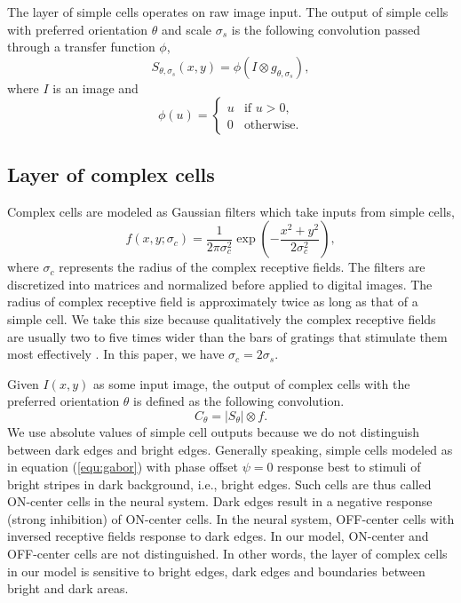 \documentclass[5p]{elsarticle}
\begin{document}
The layer of simple cells operates on raw image input. 
The output of simple cells with preferred orientation $\theta$
and scale $\sigma_s$ is the following convolution passed through a transfer function $\phi$,
\begin{equation}\label{equ:gabor}
S_{\theta,\sigma_s}(x,y)=\phi(I\otimes g_{\theta,\sigma_s}),
\end{equation}
where $I$ is an image and 
\begin{equation}\label{equ:gabor}
\phi(u)=\left\{\begin{array}{ll}
u & \text{if } u>0,\\
0 & \text{otherwise.}
\end{array}\right.
\end{equation}

\subsection{Layer of complex cells}

Complex cells are modeled as Gaussian filters which take inputs from simple cells,
\begin{equation}
f(x,y;\sigma_c)=\frac{1}{2\pi\sigma_c^2}\exp\left(-\frac{x^2+y^2}{2\sigma_c^2}\right),
\end{equation}
where $\sigma_c$ represents the radius of the complex receptive fields.
The filters are discretized into matrices and normalized before applied to digital images.
The radius of complex receptive field is approximately twice as long as that of a simple cell.
We take this size because qualitatively the complex receptive fields are usually two to five times wider 
than the bars of gratings that stimulate them most effectively \cite{movshon1978}.
In this paper, we have $\sigma_c=2\sigma_s$.

Given $I(x,y)$ as some input image, the output of complex cells
with the preferred orientation $\theta$ is defined as the following convolution.
\begin{equation}
C_{\theta}=|S_{\theta}|\otimes f.
\label{equ:complex}
\end{equation}
We use absolute values of simple cell outputs 
because we do not distinguish between dark edges and bright edges.
Generally speaking, simple cells modeled as in equation (\ref{equ:gabor}) 
with phase offset $\psi=0$ response best to stimuli of bright stripes in dark background, i.e., bright edges.
Such cells are thus called ON-center \cite{hubel1962} cells in the neural system.
Dark edges result in a negative response (strong inhibition) of ON-center cells.
In the neural system, OFF-center cells with inversed receptive fields response to dark edges.
In our model, ON-center and OFF-center cells are not distinguished.
In other words, the layer of complex cells in our model is sensitive to bright edges, dark edges 
and boundaries between bright and dark areas.
\end{document}
